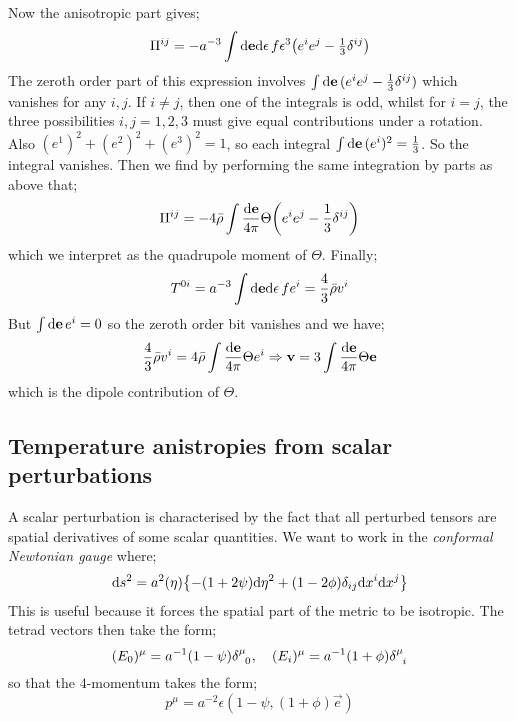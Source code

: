 Now the anisotropic part gives;
\begin{equation*}
\Pi^{ij} = -a^{-3}\int{\ud \vec e\upd{\epsilon}f\epsilon^3 \left(e^{i}e^{j} - \tfrac{1}{3}\delta^{ij}\right)}
\end{equation*}
The zeroth order part of this expression involves $\int{\text{d}\mathbf e \,(e^{i}e^{j} - \tfrac{1}{3}\delta^{ij})}$ which vanishes for any $i, j$. If $i \neq j$, then one of the integrals is odd, whilst for $i = j$, the three possibilities $i, j = 1, 2, 3$ must give equal contributions under a rotation. Also $(e^{1})^2 + (e^{2})^2 + (e^{3})^2 = 1$, so each integral $\int{\text{d}\mathbf e \,(e^{i})^2} = \tfrac{1}{3}$. So the integral vanishes. Then we find by performing the same integration by parts as above that;
\begin{equation}
\Pi^{ij} = -4\bar{\rho}\int{\frac{\ud \vec e}{4\pi}\Theta\left(e^{i}e^{j} - \frac{1}{3}\delta^{ij}\right)}
\end{equation}
which we interpret as the quadrupole moment of $\Theta$. Finally;
\begin{equation*}
T^{0i} = a^{-3}\int{\text{d}\mathbf e \text{d}\epsilon \,f e^{i}} = \frac{4}{3}\bar{\rho}v^{i}
\end{equation*}
But $\int{\text{d}\mathbf e \,e^{i}} = 0$ so the zeroth order bit vanishes and we have;
\begin{equation}
\frac{4}{3}\bar{\rho}v^{i} = 4\bar{\rho}\int{\frac{\text{d}\mathbf e}{4\pi}\Theta e^{i}} \Rightarrow \mathbf v = 3\int{\frac{\text{d}\mathbf e}{4\pi}\Theta \mathbf e}
\end{equation}
which is the dipole contribution of $\Theta$.
\subsection{Temperature anistropies from scalar perturbations}
A scalar perturbation is characterised by the fact that all perturbed tensors are spatial derivatives of some scalar quantities. We want to work in the \emph{conformal Newtonian gauge} where;
\begin{equation}
\ud s^2 = a^{2}(\eta)\set{-(1 + 2\psi)\ud \eta^2 + (1 - 2\phi)\delta_{ij}\ud x^{i}\ud x^{j}}
\end{equation}
This is useful because it forces the spatial part of the metric to be isotropic. The tetrad vectors then take the form;
\begin{equation}
(E_0)^{\mu} = a^{-1}(1 - \psi)\delta\indices{^{\mu}_{0}}, \quad (E_i)^{\mu} = a^{-1}(1 + \phi)\delta\indices{^{\mu}_{i}}
\end{equation}
so that the $4$-momentum takes the form;
\begin{equation}
p^{\mu} = a^{-2}\epsilon\left(1 - \psi, (1 + \phi)\vec{e}\right)
\end{equation}

